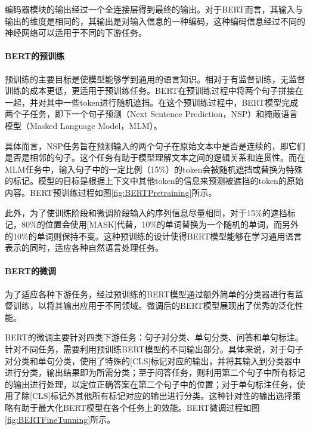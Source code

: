 编码器模块的输出经过一个全连接层得到最终的输出。对于BERT而言，其输入与输出的维度是相同的，其输出是对输入信息的一种编码，这种编码信息经过不同的神经网络可以适用于不同的下游任务。

\paragraph{BERT的预训练}

预训练的主要目标是使模型能够学到通用的语言知识。相对于有监督训练，无监督训练的成本更低，更适用于预训练任务。BERT在预训练过程中将两个句子拼接在一起，并对其中一些token进行随机遮挡。在这个预训练过程中，BERT模型完成两个子任务，即下一个句子预测（Next Sentence Prediction，NSP）和掩蔽语言模型（Masked Language Model，MLM）。

具体而言，NSP任务旨在预测输入的两个句子在原始文本中是否是连续的，即它们是否是相邻的句子。这个任务有助于模型理解文本之间的逻辑关系和连贯性。而在MLM任务中，输入句子中的一定比例（15\%）的token会被随机遮挡或替换为特殊的标记。模型的目标是根据上下文中其他token的信息来预测被遮挡的token的原始内容。BERT预训练过程如图\ref{fig:BERTPretraining}所示。



此外，为了使训练阶段和微调阶段输入的序列信息尽量相同，对于15\%的遮挡标记，80\%的位置会使用[MASK]代替，10\%的单词替换为一个随机的单词，而另外的10\%的单词则保持不变。这种预训练的设计使得BERT模型能够在学习通用语言表示的同时，适应各种自然语言处理任务。

\paragraph{BERT的微调}

为了适应各种下游任务，经过预训练的BERT模型通过额外简单的分类器进行有监督训练，以将其输出应用于不同领域。微调后的BERT模型展现出了优秀的泛化性能。

BERT的微调主要针对四类下游任务：句子对分类、单句分类、问答和单句标注。针对不同任务，需要利用预训练BERT模型的不同输出部分。具体来说，对于句子对分类和单句分类，使用了特殊的[CLS]标记对应的输出，并将其输入到分类器中进行分类，输出结果即为所需分类；至于问答任务，则利用第二个句子中所有标记的输出进行处理，以定位正确答案在第二个句子中的位置；对于单句标注任务，使用了除[CLS]标记外其他所有标记对应的输出进行分类。这种针对性的输出选择策略有助于最大化BERT模型在各个任务上的效能。BERT微调过程如图\ref{fig:BERTFineTunning}所示。

